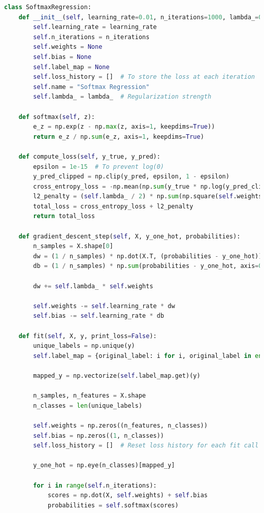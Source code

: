 \documentclass[letterpaper,10pt]{article}
\begin{document}
\begin{lstlisting}[language=Python, caption=logistic\_regression.py - SoftmaxRegression] 
    class SoftmaxRegression:
    def __init__(self, learning_rate=0.01, n_iterations=1000, lambda_=0.01):
        self.learning_rate = learning_rate
        self.n_iterations = n_iterations
        self.weights = None
        self.bias = None
        self.label_map = None
        self.loss_history = []  # To store the loss at each iteration
        self.name = "Softmax Regression"
        self.lambda_ = lambda_  # Regularization strength

    def softmax(self, z):
        e_z = np.exp(z - np.max(z, axis=1, keepdims=True))
        return e_z / np.sum(e_z, axis=1, keepdims=True)
    
    def compute_loss(self, y_true, y_pred):
        epsilon = 1e-15  # To prevent log(0)
        y_pred_clipped = np.clip(y_pred, epsilon, 1 - epsilon)
        cross_entropy_loss = -np.mean(np.sum(y_true * np.log(y_pred_clipped), axis=1))
        l2_penalty = (self.lambda_ / 2) * np.sum(np.square(self.weights))
        total_loss = cross_entropy_loss + l2_penalty
        return total_loss

    def gradient_descent_step(self, X, y_one_hot, probabilities):
        n_samples = X.shape[0]
        dw = (1 / n_samples) * np.dot(X.T, (probabilities - y_one_hot))
        db = (1 / n_samples) * np.sum(probabilities - y_one_hot, axis=0, keepdims=True)
        
        dw += self.lambda_ * self.weights
        
        self.weights -= self.learning_rate * dw
        self.bias -= self.learning_rate * db

    def fit(self, X, y, print_loss=False):
        unique_labels = np.unique(y)
        self.label_map = {original_label: i for i, original_label in enumerate(unique_labels)}

        mapped_y = np.vectorize(self.label_map.get)(y)
        
        n_samples, n_features = X.shape
        n_classes = len(unique_labels)

        self.weights = np.zeros((n_features, n_classes))
        self.bias = np.zeros((1, n_classes))
        self.loss_history = []  # Reset loss history for each fit call
        
        y_one_hot = np.eye(n_classes)[mapped_y]

        for i in range(self.n_iterations):
            scores = np.dot(X, self.weights) + self.bias
            probabilities = self.softmax(scores)
            

\end{lstlisting}
\end{document}

